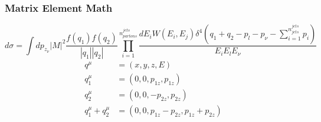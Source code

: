 \begin{frame}[shrink=23]
	\frametitle{Matrix Element Math}
	\vspace*{-0.3cm}
	\begin{block}{}
		
		\begin{equation}\label{eq:dsigma2}
			d{\sigma}={\int}dp_{z_{\nu}}|M|^{2}\frac{f(q_{1})f(q_{2})}{|q_{1}||q_{2}|}{\prod_{i=1}^{n_{partons}^{jets}}}\frac{dE_{i}W(E_{i},E_{j}){\delta^{4}}(q_{1}+q_{2}-p_{l}-p_{\nu}-{\sum_{i=1}^{n_{jets}^{jets}}}p_{i})}{E_{i}E_{l}E_{\nu}}
		\end{equation}
		\begin{subequations}\label{eq:constraints}
			\begin{align}
				q^{\mu}&=(x,y,z,E)\\
				q_{1}^{\mu}&=(0,0,p_{1z},p_{1z})\\
				q_{2}^{\mu}&=(0,0,-p_{2z},p_{2z})\\
				q_{1}^{\mu}+q_{2}^{\mu}&=(0,0,p_{1z}-p_{2z},p_{1z}+p_{2z})
			\end{align}
		\end{subequations}
		

\end{block}
\end{frame}
